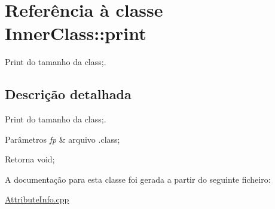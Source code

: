 \hypertarget{class_inner_class_1_1print}{}\section{Referência à classe Inner\+Class\+:\+:print}
\label{class_inner_class_1_1print}


Print do tamanho da class;.  




\subsection{Descrição detalhada}
Print do tamanho da class;. 


\begin{DoxyParams}{Parâmetros}
{\em fp} & arquivo .class; \\
\hline
\end{DoxyParams}
\begin{DoxyReturn}{Retorna}
void; 
\end{DoxyReturn}


A documentação para esta classe foi gerada a partir do seguinte ficheiro\+:\begin{DoxyCompactItemize}
\item 
\hyperlink{_attribute_info_8cpp}{Attribute\+Info.\+cpp}\end{DoxyCompactItemize}
